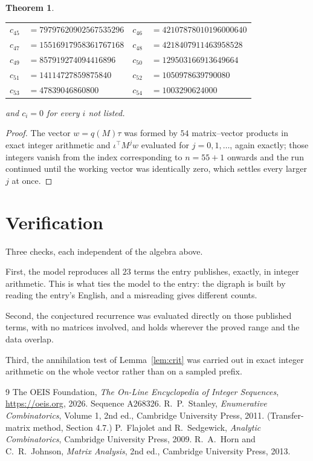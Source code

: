 \documentclass[11pt,a4paper]{article}
\theoremstyle{plain}
\newtheorem{theorem}{Theorem}
\theoremstyle{definition}
\begin{document}
\begin{theorem}
\begin{center}
\begin{tabular}{r@{\,}l@{\qquad}r@{\,}l}
$c_{45}$ & $=79797620902567535296$ & $c_{46}$ & $=42107878010196000640$ \\
$c_{47}$ & $=15516917958361767168$ & $c_{48}$ & $=4218407911463958528$ \\
$c_{49}$ & $=857919274094416896$ & $c_{50}$ & $=129503166913649664$ \\
$c_{51}$ & $=14114727859875840$ & $c_{52}$ & $=1050978639790080$ \\
$c_{53}$ & $=47839046860800$ & $c_{54}$ & $=1003290624000$ \\
\end{tabular}
\end{center}
and $c_i=0$ for every $i$ not listed.
\end{theorem}

\begin{proof}
The vector $w=q(M)\tau$ was formed by $54$ matrix--vector products in exact integer
arithmetic and $\iota^{\!\top}M^{j}w$ evaluated for $j=0,1,\dots$, again exactly; those
integers vanish from the index corresponding to $n=55+1$ onwards and the run continued
until the working vector was identically zero, which settles every larger $j$ at once.
\end{proof}

\section{Verification}

Three checks, each independent of the algebra above.

First, the model reproduces all $23$ terms the entry publishes, exactly, in integer
arithmetic. This is what ties the model to the entry: the digraph is built by reading the
entry's English, and a misreading gives different counts.

Second, the conjectured recurrence was evaluated directly on those published terms, with no
matrices involved, and holds wherever the proved range and the data overlap.

Third, the annihilation test of Lemma~\ref{lem:crit} was carried out in exact integer
arithmetic on the whole vector rather than on a sampled prefix.

\begin{thebibliography}{9}
 The OEIS Foundation, \emph{The On-Line Encyclopedia of Integer
Sequences}, \url{https://oeis.org}, 2026. Sequence A268326.
 R.~P.~Stanley, \emph{Enumerative Combinatorics}, Volume 1, 2nd ed.,
Cambridge University Press, 2011. (Transfer-matrix method, Section 4.7.)
 P.~Flajolet and R.~Sedgewick, \emph{Analytic Combinatorics}, Cambridge
University Press, 2009.
 R.~A.~Horn and C.~R.~Johnson, \emph{Matrix Analysis}, 2nd ed., Cambridge
University Press, 2013.
\end{thebibliography}
\end{document}
